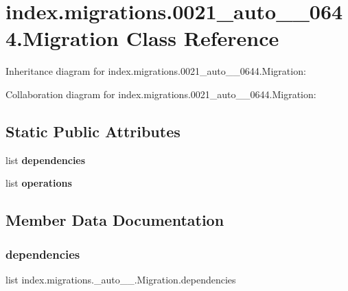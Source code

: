\hypertarget{classindex_1_1migrations_1_10021__auto__20171026__0644_1_1Migration}{}\section{index.\+migrations.0021\+\_\+auto\+\_\+\_\+0644.Migration Class Reference}
\label{classindex_1_1migrations_1_10021__auto__20171026__0644_1_1Migration}


Inheritance diagram for index.\+migrations.0021\+\_\+auto\+\_\+\_\+0644.Migration\+:


Collaboration diagram for index.\+migrations.0021\+\_\+auto\+\_\+\_\+0644.Migration\+:
\subsection*{Static Public Attributes}
\begin{DoxyCompactItemize}
\item 
list {\bfseries dependencies}
\item 
list {\bfseries operations}
\end{DoxyCompactItemize}


\subsection{Member Data Documentation}
\mbox{\label{classindex_1_1migrations_1_10021__auto__20171026__0644_1_1Migration_a076ad1af86c543e6badc9f49532a7acc}} 
\subsubsection{\texorpdfstring{dependencies}{dependencies}}
{\footnotesize\ttfamily list index.\+migrations.\+\_\+auto\+\_\+\_.\+Migration.\+dependencies\hspace{0.3cm}{\ttfamily [static]}}

